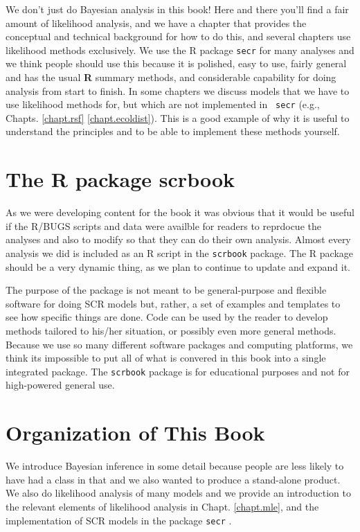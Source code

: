 We don't just do Bayesian analysis in this book! Here and there you'll
find a fair amount of likelihood analysis, and we have a chapter that
provides the conceptual and technical background for how to do this,
and several chapters use likelihood methods exclusively. We use the R
package \mbox{\tt secr} \citep{efford_etal:2009euring} for many
analyses and we think people should use this because it is polished,
easy to use, fairly general and has the usual {\bf R} summary methods,
and considerable capability for doing analysis from start to
finish. In some chapters we discuss models that we have to use
likelihood methods for, but which are not implemented in \mbox{\tt
  secr} (e.g., Chapts. \ref{chapt.rsf} \ref{chapt.ecoldist}). This is
a good example of why it is useful to understand the principles and to
be able to implement these methods yourself.

\section*{The R package scrbook}

As we were developing content for the book it was obvious that it
would be useful if the R/BUGS scripts and data were availble for
readers to reprdocue the analyses and also to modify so that they can
do their own analysis.  Almost every analysis we did is included as an
R script in the \mbox{\tt scrbook} package.
The R package should be a very dynamic thing, as we plan to
continue to update and expand it.

The purpose of the package is not meant to be general-purpose and
flexible software for doing SCR models but, rather, a set of examples
and templates to see how specific things are done. Code can be used
by the reader to develop methods tailored to his/her situation, or
possibly even more general methods.  Because we use so many different
software packages and computing platforms, we think its impossible to
put all of what is convered in this book into a single integrated
package.  The \mbox{\tt scrbook} package is for educational purposes
and not for high-powered general use.


\section*{Organization of This Book}

We introduce Bayesian inference in some detail because people are less
likely to have had a class in that and we also wanted to produce a
stand-alone product.  We also do likelihood analysis of many models
and we provide an introduction to the relevant elements of likelihood
analysis in Chapt. \ref{chapt.mle}, and the implementation of SCR
models in the package \mbox{\tt secr} \citep{efford_etal:2009euring}.

